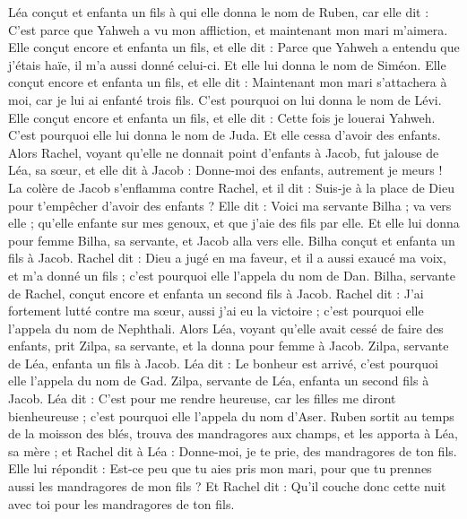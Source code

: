 \begin{multicols}{2}
Léa conçut et enfanta un fils à qui elle donna le nom de Ruben, car elle dit : C'est parce que Yahweh a vu mon affliction, et maintenant mon mari m'aimera.
Elle conçut encore et enfanta un fils, et elle dit : Parce que Yahweh a entendu que j'étais haïe, il m'a aussi donné celui-ci. Et elle lui donna le nom de Siméon.
Elle conçut encore et enfanta un fils, et elle dit : Maintenant mon mari s'attachera à moi, car je lui ai enfanté trois fils. C'est pourquoi on lui donna le nom de Lévi.
Elle conçut encore et enfanta un fils, et elle dit : Cette fois je louerai Yahweh. C'est pourquoi elle lui donna le nom de Juda. Et elle cessa d'avoir des enfants.
\VerseOne{}Alors Rachel, voyant qu’elle ne donnait point d'enfants à Jacob, fut jalouse de Léa, sa sœur, et elle dit à Jacob : Donne-moi des enfants, autrement je meurs !
La colère de Jacob s’enflamma contre Rachel, et il dit : Suis-je à la place de Dieu pour t’empêcher d'avoir des enfants ?
Elle dit : Voici ma servante Bilha ; va vers elle ; qu’elle enfante sur mes genoux, et que j’aie des fils par elle.
Et elle lui donna pour femme Bilha, sa servante, et Jacob alla vers elle.
Bilha conçut et enfanta un fils à Jacob.
Rachel dit : Dieu a jugé en ma faveur, et il a aussi exaucé ma voix, et m'a donné un fils ; c'est pourquoi elle l’appela du nom de Dan.
Bilha, servante de Rachel, conçut encore et enfanta un second fils à Jacob.
Rachel dit : J'ai fortement lutté contre ma sœur, aussi j'ai eu la victoire ; c'est pourquoi elle l’appela du nom de Nephthali.
Alors Léa, voyant qu'elle avait cessé de faire des enfants, prit Zilpa, sa servante, et la donna pour femme à Jacob.
Zilpa, servante de Léa, enfanta un fils à Jacob.
Léa dit : Le bonheur est arrivé, c'est pourquoi elle l’appela du nom de Gad.
Zilpa, servante de Léa, enfanta un second fils à Jacob.
Léa dit : C'est pour me rendre heureuse, car les filles me diront bienheureuse ; c'est pourquoi elle l’appela du nom d’Aser.
Ruben sortit au temps de la moisson des blés, trouva des mandragores aux champs, et les apporta à Léa, sa mère ; et Rachel dit à Léa : Donne-moi, je te prie, des mandragores de ton fils.
Elle lui répondit : Est-ce peu que tu aies pris mon mari, pour que tu prennes aussi les mandragores de mon fils ? Et Rachel dit : Qu'il couche donc cette nuit avec toi pour les mandragores de ton fils.

\end{multicols}
